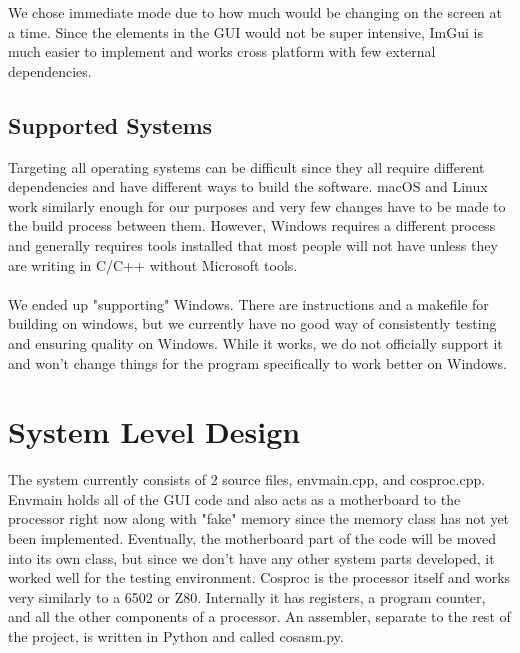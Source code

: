 \documentclass[conference]{IEEEtran}
\begin{document}
We chose immediate mode due to how much would be changing on the screen at a time. Since the elements in the GUI would not be super intensive, ImGui is much easier to implement and works cross platform with few external dependencies.

\subsection{Supported Systems}

Targeting all operating systems can be difficult since they all require different dependencies and have different ways to build the software. macOS and Linux work similarly enough for our purposes and very few changes have to be made to the build process between them. However, Windows requires a different process and generally requires tools installed that most people will not have unless they are writing in C/C++ without Microsoft tools. \\

\\

We ended up "supporting" Windows. There are instructions and a makefile for building on windows, but we currently have no good way of consistently testing and ensuring quality on Windows. While it works, we do not officially support it and won't change things for the program specifically to work better on Windows. 


\section{System Level Design}

The system currently consists of 2 source files, envmain.cpp, and cosproc.cpp. Envmain holds all of the GUI code and also acts as a motherboard to the processor right now along with "fake" memory since the memory class has not yet been implemented. Eventually, the motherboard part of the code will be moved into its own class, but since we don't have any other system parts developed, it worked well for the testing environment. Cosproc is the processor itself and works very similarly to a 6502 or Z80. Internally it has registers, a program counter, and all the other components of a processor. An assembler, separate to the rest of the project, is written in Python and called cosasm.py. 
\end{document}
